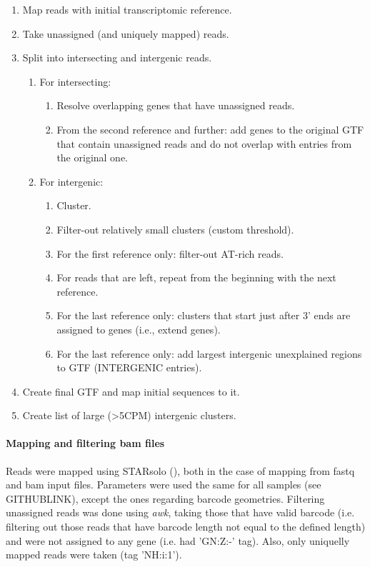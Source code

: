 \begin{enumerate}
    \item Map reads with initial transcriptomic reference.
    \item Take unassigned (and uniquely mapped) reads.
    \item Split into intersecting and intergenic reads.
    \begin{enumerate}
        \item For intersecting:
        \begin{enumerate}
            \item Resolve overlapping genes that have unassigned reads.
            \item From the second reference and further: add genes to the original GTF that contain unassigned reads
            and do not overlap with entries from the original one.
        \end{enumerate}
        \item For intergenic:
        \begin{enumerate}
            \item Cluster.
            \item Filter-out relatively small clusters (custom threshold).
            \item For the first reference only: filter-out AT-rich reads.
            \item For reads that are left, repeat from the beginning with the next reference.
            \item For the last reference only: clusters that start just after 3' ends are assigned to genes (i.e., extend genes).
            \item For the last reference only: add largest intergenic unexplained regions to GTF (INTERGENIC entries).
        \end{enumerate}
    \end{enumerate}
    \item Create final GTF and map initial sequences to it.
    \item Create list of large (\textgreater 5CPM) intergenic clusters.
\end{enumerate}

\paragraph{Mapping and filtering bam files}
Reads were mapped using STARsolo (\cite{Kaminow2021}), both in the case of mapping from fastq and bam input files.
Parameters were used the same for all samples (see GITHUBLINK), except the ones regarding barcode geometries.
Filtering unassigned reads was done using \textit{awk}, taking those that have valid barcode
(i.e. filtering out those reads that have barcode length not equal to the defined length)
and were not assigned to any gene (i.e. had 'GN:Z:-' tag).
Also, only uniquelly mapped reads were taken (tag 'NH:i:1').

